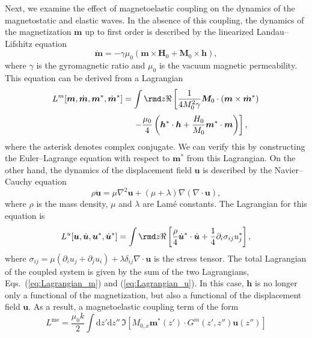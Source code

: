 \documentclass[10pt]{iopart}
\begin{document}
Next, we examine the effect of magnetoelastic coupling on the dynamics of the magnetostatic and elastic waves. In the absence of this coupling, the dynamics of the magnetization $\bm{m}$ up to first order is described by the linearized Landau--Lifshitz equation
\begin{equation}
    \dot{\bm{m}}=-\gamma\mu_0\left(\bm{m}\times\bm{H}_0+\bm{M}_0\times\bm{h}\right),\label{eq:LandauLifshitz}
\end{equation}
where $\gamma$ is the gyromagnetic ratio and $\mu_0$ is the vacuum magnetic permeability. This equation can be derived from a Lagrangian
\begin{equation*}
    L^m[\bm{m},\dot{\bm{m}},\bm{m}^*,\dot{\bm{m}}^*]=\int\rmd z\Re\left[\frac{1}{4M_0^2\gamma}\bm{M}_0\cdot(\bm{m}\times\dot{\bm{m}}^*)\right.
\end{equation*}
\begin{equation}
    \hspace{2.9cm}\left.-\frac{\mu_0}{4}\left(\bm{h}^*\cdot\bm{h}+\frac{H_0}{M_0}\bm{m}^*\cdot\bm{m}\right)\right],\label{eq:Lagrangian_m}
\end{equation}
where the asterisk denotes complex conjugate. We can verify this by constructing the Euler--Lagrange equation with respect to $\bm{m}^*$ from this Lagrangian. On the other hand, the dynamics of the displacement field $\bm{u}$ is described by the Navier--Cauchy equation
\begin{equation}
    \rho\ddot{\bm{u}}=\mu\nabla^2\bm{u}+\left(\mu+\lambda\right)\nabla\left(\nabla\cdot\bm{u}\right),\label{eq:NavierCauchy}
\end{equation}
where $\rho$ is the mass density, $\mu$ and $\lambda$ are Lam\'e constants. The Lagrangian for this equation is
\begin{equation}
    L^u[\bm{u},\dot{\bm{u}},\bm{u}^*,\dot{\bm{u}}^*]=\int\rmd z\Re\left[\frac{\rho}{4}\dot{\bm{u}}^*\cdot\dot{\bm{u}}+\frac{1}{4}\partial_i\sigma_{ij}u_j^*\right],\label{eq:Lagrangian_u}
\end{equation}
where $\sigma_{ij}=\mu(\partial_i u_j+\partial_j u_i)+\lambda\delta_{ij}\nabla\cdot\bm{u}$ is the stress tensor. The total Lagrangian of the coupled system is given by the sum of the two Lagrangians, Eqs.~(\ref{eq:Lagrangian_m}) and (\ref{eq:Lagrangian_u}). In this case, $\bm{h}$ is no longer only a functional of the magnetization, but also a functional of the displacement field $\bm{u}$. As a result, a magnetoelastic coupling term of the form
\begin{equation}
    L^{\mathrm{me}}
    =
    \frac{\mu_0 k}{2}
    \int\mathrm{d}z'\mathrm{d}z''\,
    \Im\left[
    M_{0,x}\bm{m}^*(z')\cdot G^m(z',z'')\bm{u}(z'')
    \right]
\end{equation}
\end{document}
